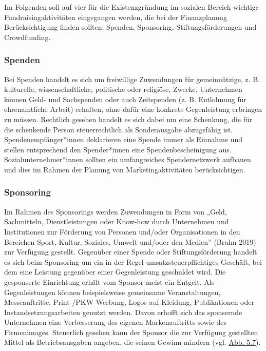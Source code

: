 \documentclass[
  letterpaper,
]{book}
\begin{document}
Im Folgenden soll auf vier für die Existenzgründung im sozialen Bereich
wichtige Fundraisingaktivitäten eingegangen werden, die bei der
Finanzplanung Berücksichtigung finden sollten: Spenden, Sponsoring,
Stiftungsförderungen und Crowdfunding.

\subsubsection{Spenden}\label{spenden}

Bei Spenden handelt es sich um freiwillige Zuwendungen für
gemeinnützige, z. B. kulturelle, wissenschaftliche, politische oder
religiöse, Zwecke. Unternehmen können Geld- und Sachspenden oder auch
Zeitspenden (z. B. Entlohnung für ehrenamtliche Arbeit) erhalten, ohne
dafür eine konkrete Gegenleistung erbringen zu müssen. Rechtlich gesehen
handelt es sich dabei um eine Schenkung, die für die schenkende Person
steuerrechtlich als Sonderausgabe abzugsfähig ist.
Spendenempfänger*innen deklarieren eine Spende immer als Einnahme und
stellen entsprechend den Spender*innen eine Spendenbescheinigung aus.
Sozialunternehmer*innen sollten ein umfangreiches Spendernetzwerk
aufbauen und dies im Rahmen der Planung von Marketingaktivitäten
berücksichtigen.

\subsubsection{Sponsoring}\label{sponsoring}

Im Rahmen des Sponsorings werden Zuwendungen in Form von „Geld,
Sachmitteln, Dienstleistungen oder Know-how durch Unternehmen und
Institutionen zur Förderung von Personen und/oder Organisationen in den
Bereichen Sport, Kultur, Soziales, Umwelt und/oder den Medien'' (Bruhn
2019) zur Verfügung gestellt. Gegenüber einer Spende oder
Stiftungsförderung handelt es sich beim Sponsoring um ein in der Regel
umsatzsteuerpflichtiges Geschäft, bei dem eine Leistung gegenüber einer
Gegenleistung geschuldet wird. Die gesponserte Einrichtung erhält vom
Sponsor meist ein Entgelt. Als Gegenleistungen können beispielsweise
gemeinsame Veranstaltungen, Messeauftritte, Print-/PKW-Werbung, Logos
auf Kleidung, Publikationen oder Instandsetzungsarbeiten genutzt werden.
Davon erhofft sich das sponsernde Unternehmen eine Verbesserung des
eigenen Markenauftritts sowie des Firmenimages. Steuerlich gesehen kann
der Sponsor die zur Verfügung gestellten Mittel als Betriebsausgaben
angeben, die seinen Gewinn mindern (vgl. \hyperref[figure57]{Abb. 5.7}).
\end{document}
